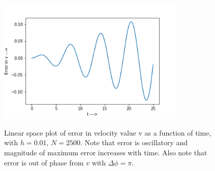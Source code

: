 \documentclass{report}
\begin{document}
\begin{figure}[H]
	\centering
	\includegraphics[width = 0.8\textwidth]{eVe.png}
	\label{errorinVe}
	\caption{Linear space plot of error in velocity value v as a function of time, with $h=0.01$, $N=2500$. Note that error is oscillatory and magnitude of maximum error increases with time. Also note that error is out of phase from $v$ with $\Delta\phi =\pi$.}
\end{figure}
\end{document}
